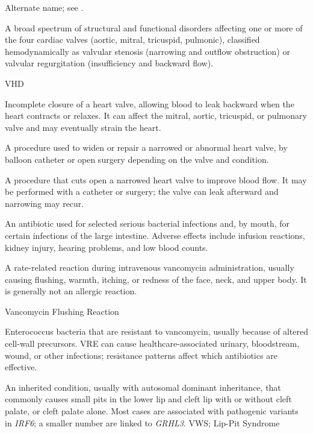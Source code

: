  Alternate name; see .

 A broad spectrum of structural and functional disorders affecting one or more of the four cardiac valves (aortic, mitral, tricuspid, pulmonic), classified hemodynamically as valvular stenosis (narrowing and outflow obstruction) or valvular regurgitation (insufficiency and backward flow).

\synonyms
VHD

 Incomplete closure of a heart valve, allowing blood to leak backward when the heart contracts or relaxes. It can affect the mitral, aortic, tricuspid, or pulmonary valve and may eventually strain the heart.

 A procedure used to widen or repair a narrowed or abnormal heart valve, by balloon catheter or open surgery depending on the valve and condition.

 A procedure that cuts open a narrowed heart valve to improve blood flow. It may be performed with a catheter or surgery; the valve can leak afterward and narrowing may recur.

 An antibiotic used for selected serious bacterial infections and, by mouth, for certain infections of the large intestine. Adverse effects include infusion reactions, kidney injury, hearing problems, and low blood counts.

 A rate-related reaction during intravenous vancomycin administration, usually causing flushing, warmth, itching, or redness of the face, neck, and upper body. It is generally not an allergic reaction.

\synonyms
Vancomycin Flushing Reaction

 Enterococcus bacteria that are resistant to vancomycin, usually because of altered cell-wall precursors. VRE can
cause healthcare-associated urinary, bloodstream, wound, or other infections; resistance patterns affect which antibiotics are effective.

 An inherited condition, usually with autosomal dominant inheritance, that commonly causes small pits in the lower lip and cleft lip with or without cleft palate, or cleft palate alone. Most cases are associated with pathogenic variants in \textit{IRF6}; a smaller number are linked to \textit{GRHL3}.
\synonyms
VWS; Lip-Pit Syndrome

